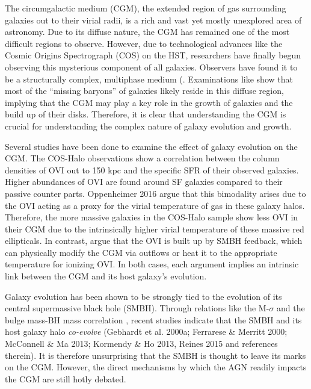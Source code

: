 \documentclass[]{emulateapj}
\begin{document}
The circumgalactic medium (CGM), the extended region of gas surrounding galaxies out to their virial radii, is a rich and vast yet mostly unexplored area of astronomy. Due to its diffuse nature, the CGM has remained one of the most difficult regions to observe. However, due to technological advances like the Cosmic Origins Spectrograph (COS) on the HST, researchers have finally begun observing this mysterious component of all galaxies. Observers have found it to be a structurally complex, multiphase medium (\citep{Tumlinson2011,Werk2012,Werk2013a,Werk2016,Tumlinson2017}. Examinations like \cite{Werk2014} show that most of the ``missing baryons'' of galaxies likely reside in this diffuse region, implying that the CGM may play a key role in the growth of galaxies and the build up of their disks. Therefore, it is clear that understanding the CGM is crucial for understanding the complex nature of galaxy evolution and growth. 

Several studies have been done to examine the effect of galaxy evolution on the CGM. The COS-Halo observations show a correlation between the column densities of OVI out to 150 kpc and the specific SFR of their observed galaxies. Higher abundances of OVI are found around SF galaxies compared to their passive counter parts. Oppenheimer 2016 argue that this bimodality arises due to the OVI acting as a proxy for the virial temperature of gas in these galaxy halos. Therefore, the more massive galaxies in the COS-Halo sample show less OVI in their CGM due to the intrinsically higher virial temperature of these massive red ellipticals. In contrast, \cite{Suresh2017} argue that the OVI is built up by SMBH feedback, which can physically modify the CGM via outflows or heat it to the appropriate temperature for ionizing OVI. In both cases, each argument implies an intrinsic link between the CGM and its host galaxy's evolution.

Galaxy evolution has been shown to be strongly tied to the evolution of its central supermassive black hole (SMBH). Through relations like the M-$\sigma$ and the bulge mass-BH mass correlation \citep{Ferrarese2000,Mcconnell2013}, recent studies indicate that the SMBH and its host galaxy halo \textit{co-evolve} (Gebhardt et al. 2000a; Ferrarese \& Merritt 2000; McConnell \& Ma 2013; Kormendy \& Ho 2013, Reines 2015 and references therein).   It is therefore unsurprising that the SMBH is thought to leave its marks on the CGM. However, the direct mechanisms by which the AGN readily impacts the CGM are still hotly debated. 
\end{document}
